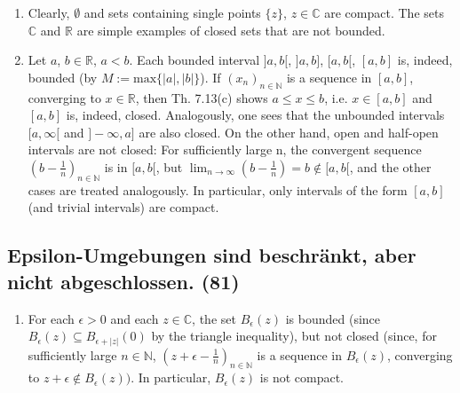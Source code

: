 \begin{enumerate}[label=(\alph*)]
\item Clearly, $\emptyset$ and sets containing single points $\{ z\}$, $z \in \mathbb{C}$ are compact. The sets $\mathbb{C}$ and $\mathbb{R}$ are simple examples of closed sets that are not bounded.
\item Let $a$, $b \in \mathbb{R}$, $a < b$. Each bounded interval $]a, b[$, $]a, b]$, $[a, b[$, $[a, b]$ is, indeed, bounded (by $M := \text{max}\{ |a|, |b|\}$). If $(x_n)_{n\in\mathbb{N}}$ is a sequence in $[a, b]$, converging to $x \in \mathbb{R}$, then Th. 7.13(c) shows $a \leq x \leq b$, i.e. $x \in [a, b]$ and $[a, b]$ is, indeed,
closed. Analogously, one sees that the unbounded intervals $[a,\infty[$ and $]-\infty, a]$ are also closed. On the other hand, open and half-open intervals are not closed: For
sufficiently large n, the convergent sequence $(b - \frac{1}{n})_{n\in \mathbb{N}}$ is in $[a, b[$, but $\lim_{n\to \infty}(b - \frac{1}{n}) = b \notin [a, b[$, and the other cases are treated analogously. In particular, only intervals of the form $[a, b]$ (and trivial intervals) are compact.
\end{enumerate}

\subsection{Epsilon-Umgebungen sind beschränkt, aber nicht abgeschlossen. (81)}

\begin{enumerate}[label=(\alph*),start=3]
\item For each $\epsilon > 0$ and each $z \in \mathbb{C}$, the set $B_{\epsilon}(z)$ is bounded (since $B_{\epsilon}(z) \subseteq B_{\epsilon+|z|}(0)$ by the triangle inequality), but not closed (since, for sufficiently large $n \in \mathbb{N}$, $( z + \epsilon - \frac { 1} { n })_{n \in \mathbb { N }}$ is a sequence in $B_{\epsilon}(z)$, converging to $z + \epsilon \notin B_{\epsilon}(z))$. In particular, $B_{\epsilon}(z)$ is not compact.
\end{enumerate}


